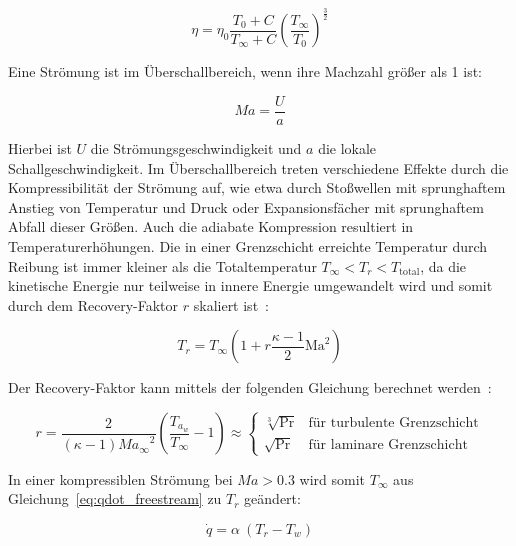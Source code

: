 \begin{equation}
  \label{eq:dynamische_viskositaet}
  \eta = \eta_0 \frac{T_0 + C}{T_{\infty} + C} {\left( \frac{T_{\infty}}{T_0} \right)}^{\frac{3}{2}}
\end{equation}

Eine Strömung ist im Überschallbereich, wenn ihre Machzahl größer als 1 ist:

\begin{equation}
  \label{eq:machzahl}
  Ma = \frac{U}{a}
\end{equation}

Hierbei ist $U$ die Strömungsgeschwindigkeit und $a$ die lokale Schallgeschwindigkeit. Im Überschallbereich treten verschiedene
Effekte durch die Kompressibilität der Strömung auf, wie etwa durch Stoßwellen mit sprunghaftem Anstieg von Temperatur und Druck
oder Expansionsfächer mit sprunghaftem Abfall dieser Größen. Auch die adiabate Kompression resultiert in Temperaturerhöhungen.
Die in einer Grenzschicht erreichte Temperatur durch Reibung
ist immer kleiner als die Totaltemperatur \mbox{$T_{\infty} < T_r < T_\mathrm{total}$}, da die kinetische Energie nur teilweise in innere Energie
umgewandelt wird und somit durch dem Recovery-Faktor $r$ skaliert ist~\cite{Anderson-2017}:

\begin{equation}
  \label{eq:recovery_temperatur}
  T_r = T_{\infty} \left( 1 + r \frac{\kappa - 1}{2} \text{Ma}^2 \right)
\end{equation}

Der Recovery-Faktor kann mittels der folgenden Gleichung berechnet werden~\cite{Anderson-2017}:

\begin{equation}
  \label{eq:recovery_faktor}
  r = \frac{2}{\left( \kappa - 1 \right) {Ma_{\infty}}^2} \left( \frac{T_{a_{w}}}{T_{\infty}} - 1 \right) \approx
  \begin{cases}
    \sqrt[3]{\text{Pr}} & \text{für turbulente Grenzschicht}\\
    \sqrt{\text{Pr}} & \text{für laminare Grenzschicht}
  \end{cases}
\end{equation}

In einer kompressiblen Strömung bei $Ma > 0.3$ wird somit $T_{\infty}$ aus Gleichung~\ref{eq:qdot_freestream} zu $T_r$ geändert:

\begin{equation}
  \label{eq:qdot_recovery}
  \dot{q} = \alpha \ (T_r - T_w)
\end{equation}

